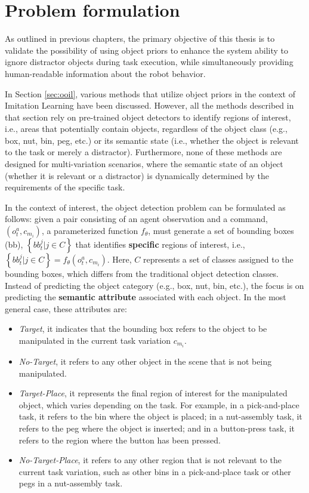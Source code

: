 \section{Problem formulation}
\label{sec:cod_problem}
As outlined in previous chapters, the primary objective of this thesis is to validate the possibility of using object priors to enhance the system ability to ignore distractor objects during task execution, while simultaneously providing human-readable information about the robot behavior.

In Section \ref{sec:ooil}, various methods that utilize object priors in the context of Imitation Learning have been discussed. However, all the methods described in that section rely on pre-trained object detectors to identify regions of interest, i.e., areas that potentially contain objects, regardless of the object class (e.g., box, nut, bin, peg, etc.) or its semantic state (i.e., whether the object is relevant to the task or merely a distractor). Furthermore, none of these methods are designed for multi-variation scenarios, where the semantic state of an object (whether it is relevant or a distractor) is dynamically determined by the requirements of the specific task.

In the context of interest, the object detection problem can be formulated as follows: given a pair consisting of an agent observation and a command, $\left( o_{t}^{a}, c_{m_{i}} \right)$,  a parameterized function $f_{\theta}$, must generate a set of bounding boxes (bb), $\left\{ bb^{j}_{t} | j \in C \right\}$ that identifies \textbf{specific} regions of interest, i.e., $\left\{ bb^{j}_{t} | j \in C \right\} = f_{\theta}(o_{t}^{a}, c_{m_{i}})$. Here, $C$ represents a set of classes assigned to the bounding boxes, which differs from the traditional object detection classes. Instead of predicting the object category (e.g., box, nut, bin, etc.), the focus is on predicting the \textbf{semantic attribute} associated with each object. In the most general case, these attributes are:

\begin{itemize} 
    \item \textit{Target}, it indicates that the bounding box refers to the object to be manipulated in the current task variation $c_{m_{i}}$. 
    \item \textit{No-Target}, it refers to any other object in the scene that is not being manipulated. 
    \item \textit{Target-Place}, it represents the final region of interest for the manipulated object, which varies depending on the task. For example, in a pick-and-place task, it refers to the bin where the object is placed; in a nut-assembly task, it refers to the peg where the object is inserted; and in a button-press task, it refers to the region where the button has been pressed. 
    \item \textit{No-Target-Place}, it refers to any other region that is not relevant to the current task variation, such as other bins in a pick-and-place task or other pegs in a nut-assembly task. 
\end{itemize}

